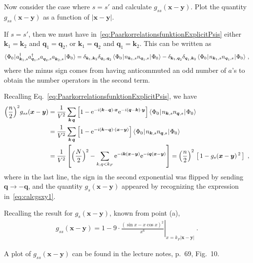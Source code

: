 \documentclass[11pt,a4paper]{article}
\newcommand{\ee}{{\mathrm{e}}}
\newcommand{\abs}[1]{\lvert#1\rvert}
\newcommand{\matrixel}[3]{\langle\hspace{0.15mm}#1\hspace{0.25mm}\vert\hspace{0.25mm} #2 \hspace{0.25mm}\vert\hspace{0.25mm}#3\hspace{0.15mm}\rangle}
\newcommand{\boldx}{{\boldsymbol x}}
\newcommand{\boldy}{{\boldsymbol y}}
\newcommand{\boldk}{{\boldsymbol k}}
\newcommand{\boldq}{{\boldsymbol q}}
\newcommand{\nodagger}{{\vphantom{\dagger}}} %
\begin{document}
\begin{exenumerate}
\item Now consider the case where $s=s'$ and calculate $g_{ss}(\boldx-\boldy)$. Plot the quantity
  $g_{ss}(\boldx-\boldy)$ as a function of $\abs{\boldx-\boldy}$.

  \begin{loesung}
    If $s=s'$, then we must have in~\eqref{eq:PaarkorrelationsfunktionExplicitPsis} either $\boldk_1=\boldk_2$
    and $\boldq_1=\boldq_2$, or $\boldk_1=\boldq_2$ and $\boldq_1=\boldk_2$. This can be written as
    \begin{align}
      \matrixel{\Phi_0}{a^\dagger_{\boldk_1,s}a^\dagger_{\boldq_1,s}
        a^\nodagger_{\boldq_2,s}a^\nodagger_{\boldk_2,s}}{\Phi_0}
      = \delta_{\boldk_1,\boldk_2}\delta_{\boldq_1,\boldq_2}\,
      \matrixel{\Phi_0}{n_{\boldk_1,s} n_{\boldq_1,s}}{\Phi_0}
      - \delta_{\boldk_1,\boldq_2}\delta_{\boldq_1,\boldk_2}\,
      \matrixel{\Phi_0}{n_{\boldk_1,s} n_{\boldq_1,s}}{\Phi_0}\ ,
    \end{align}
    where the minus sign comes from having anticommuted an odd number of $a$'s to obtain the number operators in
    the second term.

    Recalling Eq.~\eqref{eq:PaarkorrelationsfunktionExplicitPsis}, we have
    \begin{align}
      \Bigl(\frac{n}{2}\Bigr)^2 g_{ss}(\boldx-\boldy)
      &= \frac{1}{V^2} \sum_{\boldk\,\boldq}
      \left[1 - \ee^{-i\left(\boldk-\boldq\right)\cdot\boldx}\ee^{-i\left(\boldq-\boldk\right)\cdot\boldy}\right]
      \matrixel{\Phi_0}{n_{\boldk,s}n_{\boldq,s}}{\Phi_0} \nonumber\\
      &= \frac{1}{V^2} \sum_{\boldk\,\boldq}
      \left[1 - \ee^{-i\left(\boldk-\boldq\right)\cdot\left(\boldx-\boldy\right)}\right]
      \matrixel{\Phi_0}{n_{\boldk,s}n_{\boldq,s}}{\Phi_0} \nonumber\\
      &= \frac{1}{V^2} \left[ \Bigl(\frac{N}{2}\Bigr)^2
        - \sum_{k,q<k_F} \ee^{-i\boldk\left(\boldx-\boldy\right)}\ee^{-i\boldq\left(\boldx-\boldy\right)} \right]
      = \Bigl(\frac{n}{2}\Bigr)^2\,\left[\,1 - g_s(\boldx-\boldy)\,^2\,\right]\ ,
    \end{align}
    where in the last line, the sign in the second exponential was flipped by sending $\boldq\rightarrow-\boldq$,
    and the quantity $g_s(\boldx-\boldy)$ appeared by recognizing the expression in~\eqref{eq:calcgsxy1}.

    Recalling the result for $g_s(\boldx-\boldy)$, known from point (a),
    \begin{align}
      g_{ss}(\boldx-\boldy)
      = 1 - 9\cdot\left.\frac{\left(\sin x - x\cos x\right)^2}{x^6}\right\rvert_{x=k_F\abs{\boldx-\boldy}}\ .
    \end{align}

    A plot of $g_{ss}(\boldx-\boldy)$ can be found in the lecture notes, p.~69, Fig.~10.
  \end{loesung}
\end{exenumerate}
\end{document}
